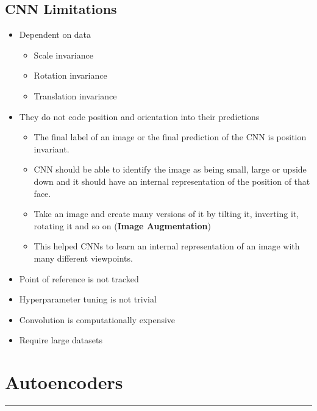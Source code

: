 \documentclass[11pt]{article}
\begin{document}
\subsection{CNN Limitations}
\begin{itemize}
\item Dependent on data
\begin{itemize}
\item Scale invariance
\item Rotation invariance
\item Translation invariance
\end{itemize}
\item They do not code position and orientation into their predictions
\begin{itemize}
\item The final label of an image or the final prediction of the CNN is position invariant.
\item CNN should be able to identify the image as being small, large or upside down and it should have an internal representation of the position of that face.
\item Take an image and create many versions of it by tilting it, inverting it, rotating it and so on (\textbf{Image Augmentation})
\item This helped CNNs to learn an internal representation of an image with many different viewpoints.
\end{itemize}
\item Point of reference is not tracked
\item Hyperparameter tuning is not trivial
\item Convolution is computationally expensive
\item Require large datasets
\end{itemize}



\pagebreak



\section{Autoencoders}
\hrule \vspace{15pt}
\end{document}
